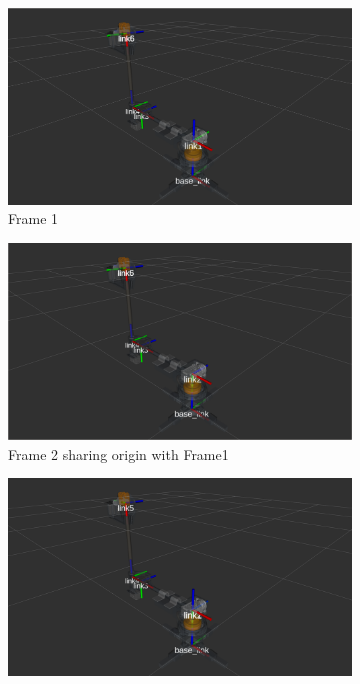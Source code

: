 \begin{figure}[h!]
  \centering
  \captionsetup{justification=centering}
  \begin{subfigure}[t]{0.2\linewidth}
    \includegraphics[width=\linewidth]{r_mini_frame1.png}
     \caption{Frame 1}
  \end{subfigure}
  \begin{subfigure}[t]{0.2\linewidth}
    \includegraphics[width=\linewidth]{r_mini_frame2.png}
    \caption{Frame 2 sharing origin with Frame1}
  \end{subfigure}
  \begin{subfigure}[t]{0.2\linewidth}
    \includegraphics[width=\linewidth]{r_mini_frame5.png}

\end{subfigure}
\end{figure}
